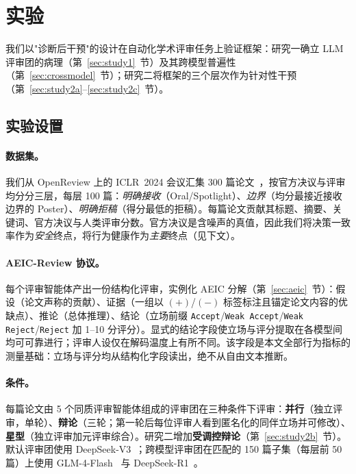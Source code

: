 \section{实验}
\label{sec:exp}

我们以"诊断后干预"的设计在自动化学术评审任务上验证框架：研究一确立 LLM 评审团的病理（第~\ref{sec:study1}~节）及其跨模型普遍性（第~\ref{sec:crossmodel}~节）；研究二将框架的三个层次作为针对性干预（第~\ref{sec:study2a}--\ref{sec:study2c}~节）。

\subsection{实验设置}
\label{sec:setup}

\paragraph{数据集。}
我们从 OpenReview 上的 ICLR~2024 会议汇集 300 篇论文~\cite{openreview2024iclr}，按官方决议与评审均分分三层，每层 100 篇：\emph{明确接收}（Oral/Spotlight）、\emph{边界}（均分最接近接收边界的 Poster）、\emph{明确拒稿}（得分最低的拒稿）。每篇论文贡献其标题、摘要、关键词、官方决议与人类评审分数。官方决议是含噪声的真值，因此我们将决策一致率作为\emph{安全}终点，将行为健康作为\emph{主要}终点（见下文）。

\paragraph{AEIC-Review 协议。}
每个评审智能体产出一份结构化评审，实例化 AEIC 分解（第~\ref{sec:aeic}~节）：假设（论文声称的贡献）、证据（一组以 $(+)$/$(-)$ 标签标注且锚定论文内容的优缺点）、推论（总体推理）、结论（立场前缀 \texttt{Accept}/\texttt{Weak Accept}/\texttt{Weak Reject}/\texttt{Reject} 加 1--10 分评分）。显式的结论字段使立场与评分提取在各模型间均可可靠进行；评审人设仅在解码温度上有所不同。该字段是本文全部行为指标的测量基础：立场与评分均从结构化字段读出，绝不从自由文本推断。

\paragraph{条件。}
每篇论文由 5 个同质评审智能体组成的评审团在三种条件下评审：\textbf{并行}（独立评审，单轮）、\textbf{辩论}（三轮；第一轮后每位评审人看到匿名化的同伴立场并可修改）、\textbf{星型}（独立评审加元评审综合）。研究二增加\textbf{受调控辩论}（第~\ref{sec:study2b}~节）。默认评审团使用 DeepSeek-V3~\cite{deepseek2024v3}；跨模型评审团在匹配的 150 篇子集（每层前 50 篇）上使用 GLM-4-Flash~\cite{glm2024chatglm} 与 DeepSeek-R1~\cite{deepseekai2025r1}。

